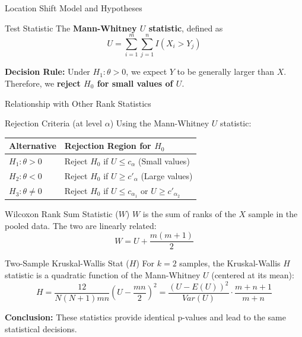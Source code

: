\documentclass[8pt]{beamer}
\begin{document}
\begin{frame}{Location Shift Model and Hypotheses}
    \begin{block}{Test Statistic }
        The \textbf{Mann-Whitney $U$ statistic}, defined as
        $$U = \sum_{i=1}^{m} \sum_{j=1}^{n} I(X_i > Y_j)$$
        
        \textbf{Decision Rule:} Under $H_1: \theta > 0$, we expect $Y$ to be generally larger than $X$. Therefore, we \textbf{reject $H_0$ for small values of $U$}.
    \end{block}


\end{frame}

\begin{frame}{Relationship with Other Rank Statistics}

\begin{block}{Rejection Criteria (at level $\alpha$)}
        Using the Mann-Whitney $U$ statistic:
        \centering
        \begin{tabular}{ll}
            \toprule
            \textbf{Alternative} & \textbf{Rejection Region for $H_0$} \\
            \midrule
            $H_1: \theta > 0$ & Reject $H_0$ if $U \leq c_{\alpha}$ (Small values) \\
            $H_2: \theta < 0$ & Reject $H_0$ if $U \geq c'_{\alpha}$ (Large values) \\
            $H_3: \theta \neq 0$ & Reject $H_0$ if $U \leq c_{\alpha_1}$ or $U \geq c'_{\alpha_2}$ \\
            \bottomrule
        \end{tabular}
    \end{block}
\begin{block}{Wilcoxon Rank Sum Statistic ($W$)}
    $W$ is the sum of ranks of the $X$ sample in the pooled data. The two are linearly related:
    $$W = U + \frac{m(m+1)}{2}$$
    \end{block}

    \begin{block}{Two-Sample Kruskal-Wallis Stat ($H$)}
    For $k=2$ samples, the Kruskal-Wallis $H$ statistic is a quadratic function of the Mann-Whitney $U$ (centered at its mean):
    $$H = \frac{12}{N(N+1)mn} \left( U - \frac{mn}{2} \right)^2 = \frac{(U - E(U))^2}{Var(U)} \cdot \frac{m+n+1}{m+n}$$
    \end{block}
    
    \centering
    \textbf{Conclusion:} These statistics provide identical p-values and lead to the same statistical decisions.


\end{frame}
\end{document}

